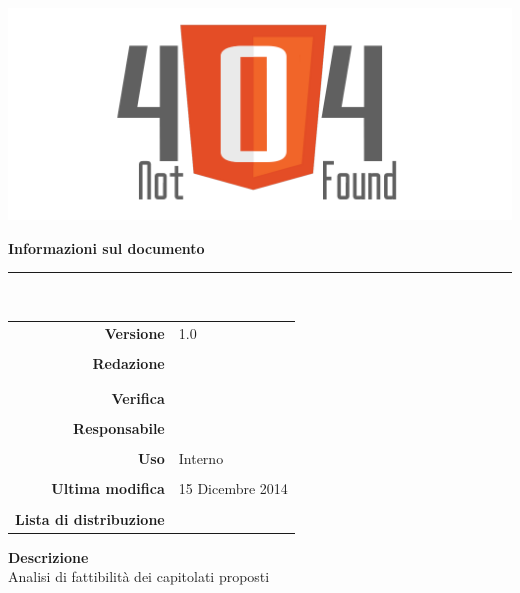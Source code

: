 \thispagestyle{empty}

\begin{titlepage}
	\begin{center}
	\begin{Huge}
		\textbf{\gruppo} \\
	\end{Huge}
	\vspace{0.5cm}
	\begin{Large}
		\textbf{\capitolato}
	\end{Large}
	
	\vspace{1cm}
    
	\includegraphics[scale=0.35]{../logo/logo404_Extends.png}
	\vspace{1cm}
	\begin{Huge}
		\textbf{\titDoc}
	\end{Huge}
	
	\vspace{1cm}
	\textbf{Informazioni sul documento}\\
    \rule{10cm}{.4pt} \\
	\begin{table}[h]
	\begin{center}
	\begin{tabular}{r | l}
		\textbf{Versione} & 1.0 \\ \\
		\textbf{Redazione} & \CaMa \\
			& \MaMo \\ \\
		\textbf{Verifica} &\GoIs \\ \\
		\textbf{Responsabile} & \VeFe \\ \\
		\textbf{Uso} & Interno \\ \\
		\textbf{Ultima modifica} & 15 Dicembre 2014 \\ \\
		\textbf{Lista di distribuzione} & \gruppo \\ 
	\end{tabular}
	\end{center}
	\end{table}
			\textbf{Descrizione} \\
			Analisi di fattibilità dei capitolati proposti
	\end{center}
\end{titlepage}
